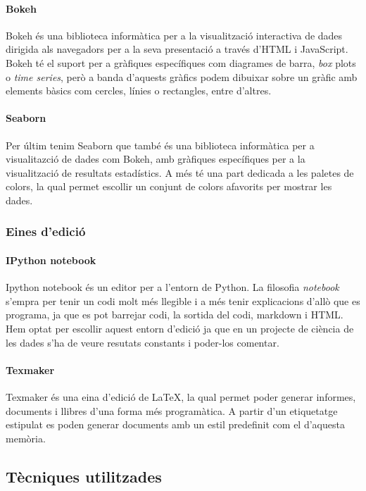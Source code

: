 \documentclass[12pt,a4paper,catalan]{article}
\begin{document}
\newpage

\paragraph{Bokeh}
Bokeh \cite{bokeh} és una biblioteca informàtica per a la visualització interactiva de dades dirigida als navegadors per a la seva presentació a través d'HTML i JavaScript. Bokeh té el suport per a gràfiques específiques com diagrames de barra, \textit{box} plots o \textit{time series}, però a banda d'aquests gràfics podem dibuixar sobre un gràfic amb elements bàsics com cercles, línies o rectangles, entre d'altres.

\paragraph{Seaborn}
Per últim tenim Seaborn \cite{seaborn} que també és una biblioteca informàtica per a visualitazció de dades com Bokeh, amb gràfiques específiques per a la visualització de resultats estadístics. A més té una part dedicada a les paletes de colors, la qual permet escollir un conjunt de colors afavorits per mostrar les dades.


\subsubsection{Eines d'edició}
\paragraph{IPython notebook}
Ipython notebook \cite{ipythonnotebook} és un editor per a l'entorn de Python. La filosofia \textit{notebook} s'empra per tenir un codi molt més llegible i a més tenir explicacions d'allò que es programa, ja que es pot barrejar codi, la sortida del codi, markdown i HTML. Hem optat per escollir aquest entorn d'edició ja que en un projecte de ciència de les dades s'ha de veure resutats constants i poder-los comentar.

\paragraph{Texmaker}
Texmaker \cite{texmaker} és una eina d'edició de \LaTeX, la qual permet poder generar informes, documents i llibres d'una forma més programàtica. A partir d'un etiquetatge estipulat es poden generar documents amb un estil predefinit com el d'aquesta memòria.

\newpage
\hypertarget{tecniquesutilitzades}{
	\subsection{Tècniques utilitzades}
}
\end{document}
